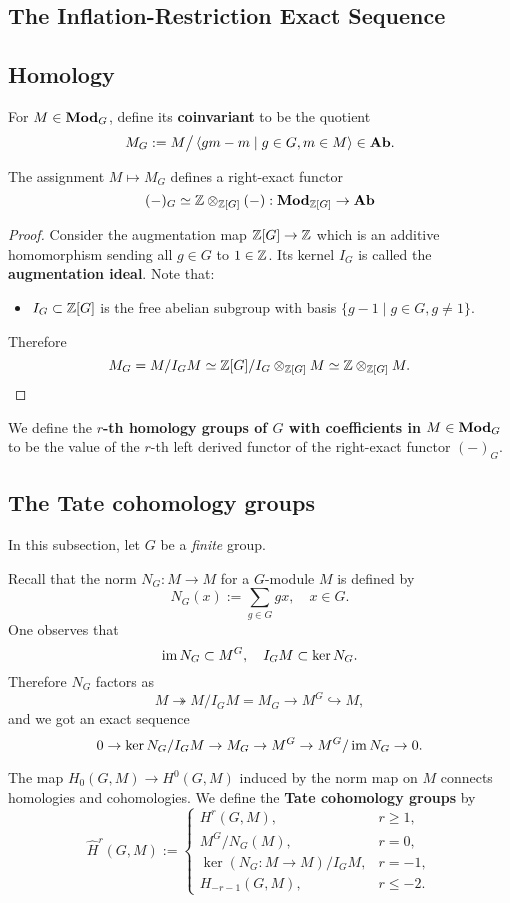 \subsection{The Inflation-Restriction Exact Sequence}



\subsection{Homology}

For $M\in \mathbf{Mod}_G$, define its \textbf{coinvariant} to be the quotient
\[M_G := M\big/ \left\langle gm - m\mid g\in G, m\in M \right\rangle\in \mathbf{Ab}.\]

\begin{lemma}
    The assignment $M\mapsto M_G$ defines a right-exact functor \[(-)_G\simeq \mathbb{Z}\otimes_{\mathbb{Z}[G]}(-) : \mathbf{Mod}_{\mathbb{Z}[G]}\to\mathbf{Ab}\]
\end{lemma}
\begin{proof}
Consider the augmentation map $\mathbb{Z}[G]\to\mathbb{Z}$ which is an additive homomorphism sending all $g\in G$ to $1\in\mathbb{Z}$.
Its kernel $I_G$ is called the \textbf{augmentation ideal}.
Note that:\begin{itemize}
    \item $I_G\subset\mathbb{Z}[G]$ is the free abelian subgroup with basis $\{g - 1 \mid g\in G, g\ne 1\}$.
\end{itemize}
Therefore \[M_G = M/I_GM\simeq \mathbb{Z}[G]/I_G\otimes_{\mathbb{Z}[G]} M\simeq \mathbb{Z}\otimes_{\mathbb{Z}[G]} M.\qedhere\]
\end{proof}
We define the \textbf{$r$-th homology groups of $G$ with coefficients in $M\in\mathbf{Mod}_G$} to be the value of the $r$-th left derived functor of the right-exact functor $(-)_G$.

\subsection{The Tate cohomology groups}

In this subsection, let $G$ be a \textit{finite} group.

Recall that the norm $N_G : M \to M$ for a $G$-module $M$ is defined by \[N_G(x) := \sum_{g\in G}gx,\quad x\in G.\]
One observes that \[\operatorname{im} N_G\subset M^G,\quad I_GM\subset \ker N_G.\]
Therefore $N_G$ factors as \[M\twoheadrightarrow M/I_GM = M_G\to M^G\hookrightarrow M,\] and we got an exact sequence \[0\to\ker N_G/I_GM\to M_G\to M^G\to M^G/\operatorname{im} N_G\to 0.\]

The map $H_0(G, M)\to H^0(G, M)$ induced by the norm map on $M$ connects homologies and cohomologies. We define the \textbf{Tate cohomology groups} by \[\hat H^r (G, M) := \begin{cases}
    H^r(G, M), &r\ge 1,\\
    M^G/N_G(M), &r = 0,\\
    \ker (N_G : M\to M)/I_GM, & r = -1,\\
    H_{-r-1} (G, M), & r\le -2.
\end{cases}\]

